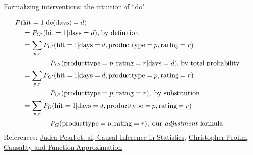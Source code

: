 \begin{frame}{Formalizing interventions: the intuition of ``do"}
    \vspace{-1.5cm}
    \vspace{-2.5cm}
    \begin{align*}
        P(&\textrm{hit}=1 | \mathrm{do}(\textrm{days})=d) \\
        & = P_{G'}(\textrm{hit}=1 | \textrm{days}=d) \textrm{, by definition} \\
        & = \sum_{p, r} P_{G'}(\textrm{hit}=1 | \textrm{days}=d, \textrm{producttype} = p, \textrm{rating} = r) \\
        & \qquad  \qquad P_{G'}(\textrm{producttype} = p, \textrm{rating} = r | \textrm{days}=d)\textrm{, by total probability} \\
        & = \sum_{p, r} P_{G'}(\textrm{hit}=1 | \textrm{days}=d, \textrm{producttype} = p, \textrm{rating} = r) \\
        & \qquad  \qquad P_{G'}(\textrm{producttype} = p, \textrm{rating} = r), \textrm{ by substitution} \\
        & =  \sum_{p, r} P_{G}(\textrm{hit}=1 | \textrm{days}=d, \textrm{producttype} = p, \textrm{rating} = r) \\
        & \qquad  \qquad P_{G}(\textrm{producttype} = p, \textrm{rating} = r), \textrm{ our \emph{adjustment} formula}
    \end{align*}
    References: \href{http://bayes.cs.ucla.edu/PRIMER/}{Judea Pearl et. al, Causal Inference in Statistics}, \href{https://cprohm.de/article/causality-and-function-approximations.html/}{Christopher Prohm, Causality and Function Approximation}
\end{frame}


